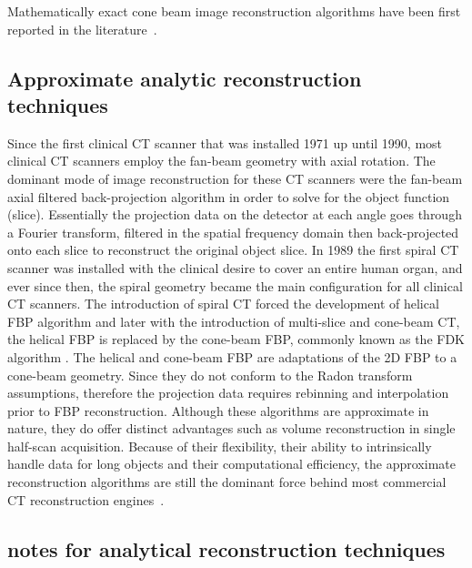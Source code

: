 Mathematically exact cone beam image reconstruction algorithms have been first reported in the literature~\citep{Tuy1983, Smith1985, Grangeat1991}.  




\subsection{Approximate analytic reconstruction techniques}
Since the first clinical CT scanner that was installed 1971 up until 1990, most clinical CT scanners employ the fan-beam geometry with axial rotation.  The dominant mode of image reconstruction for these CT scanners were the fan-beam axial filtered back-projection algorithm in order to solve for the object function (slice).  Essentially the projection data on the detector at each angle goes through a Fourier transform, filtered in the spatial frequency domain then back-projected onto each slice to reconstruct the original object slice.  In 1989 the first spiral CT scanner was installed with the clinical desire to cover an entire human organ, and ever since then, the spiral geometry became the main configuration for all clinical CT scanners.  The introduction of spiral CT forced the development of helical FBP algorithm and later with the introduction of multi-slice and cone-beam CT, the helical FBP is replaced by the cone-beam FBP, commonly known as the FDK algorithm \citep{Feldkamp1984}.  The helical and cone-beam FBP are adaptations of the 2D FBP to a cone-beam geometry.  Since they do not conform to the Radon transform assumptions, therefore the projection data requires rebinning and interpolation prior to FBP reconstruction.  Although these algorithms are approximate in nature, they do offer distinct advantages such as volume reconstruction in single half-scan acquisition.  Because of their flexibility, their ability to intrinsically handle data for long objects and their computational efficiency, the approximate reconstruction algorithms are still the dominant force behind most commercial CT reconstruction engines~\citep{Wang1993, Hsieh2007, Tang2006, Silver1998}.

\subsection{notes for analytical reconstruction techniques}

